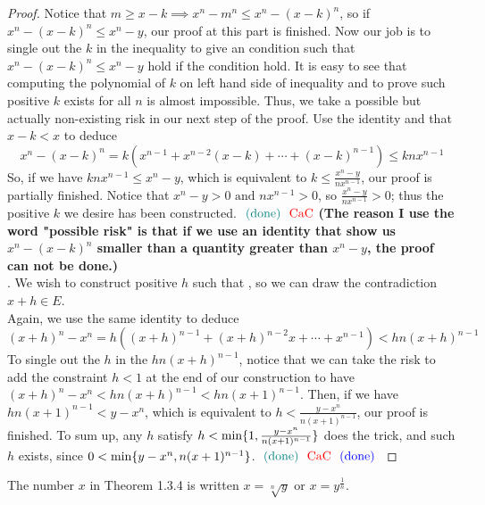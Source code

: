 \documentclass{report}
\begin{document}
\begin{proof}
Notice that $m\geq x-k\implies x^n-m^n\leq x^n-(x-k)^n$, so if $x^n-(x-k)^n\leq x^n-y$, our proof at this part is finished. Now our job is to single out the $k$ in the inequality to give an condition such that $x^n-(x-k)^n\leq x^n-y$ hold if the condition hold. It is easy to see that computing the polynomial of $k$ on left hand side of inequality and to prove such positive $k$ exists for all $n$ is almost impossible. Thus, we take a possible but actually non-existing risk in our next step of the proof. Use the identity and that $x-k<x$ to deduce
\begin{equation}
x^n-(x-k)^n=k(x^{n-1}+x^{n-2}(x-k)+\cdots +(x-k)^{n-1})\leq knx^{n-1}
\end{equation}
So, if we have $knx^{n-1}\leq x^n-y$, which is equivalent to $k\leq \frac{x^n-y}{nx^{n-1}}$, our proof is partially finished. Notice that $x^n-y>0\text{ and }nx^{n-1}>0$, so $\frac{x^n-y}{nx^{n-1}}>0$; thus the positive $k$ we desire has been constructed.  $\textcolor{teal}{\text{ (done) }}\text{ \textcolor{red}{CaC} }$\textbf{(The reason I use the word "possible risk" is that if we use an identity that show us $x^n-(x-k)^n$ smaller than a quantity greater than $x^n-y$, the proof can not be done.)} \\

. We wish to construct positive $h$ such that , so we can draw the contradiction $x+h\in E$.\\

Again, we use the same identity to deduce
 \begin{equation}
   (x+h)^n-x^n=h((x+h)^{n-1}+(x+h)^{n-2}x+\cdots +x^{n-1})<hn(x+h)^{n-1}
\end{equation}
To single out the $h$ in the  $hn(x+h)^{n-1}$, notice that we can take the risk to add the constraint $h<1$ at the end of our construction to have $(x+h)^n-x^n<hn(x+h)^{n-1}<hn(x+1)^{n-1}$. Then, if we have $hn(x+1)^{n-1}<y-x^n$, which is equivalent to $h<\frac{y-x^n}{n(x+1)^{n-1}} $, our proof is finished. To sum up, any $h$ satisfy  $h<\min \{ 1,\frac{y-x^n}{n(x+1)^{n-1}} \}$ does the trick, and such $h$ exists, since  $0<\min \{ y-x^n,n(x+1)^{n-1} \}$. $\textcolor{teal}{\text{ (done) }}\text{ \textcolor{red}{CaC} }\textcolor{blue}{\text{ (done) }}$   
\end{proof}
\begin{definition}
The number $x$ in Theorem 1.3.4 is written  $x=\sqrt[n]{y}$ or $x=y^{\frac{1}{n}}$.
\end{definition}
\end{document}
